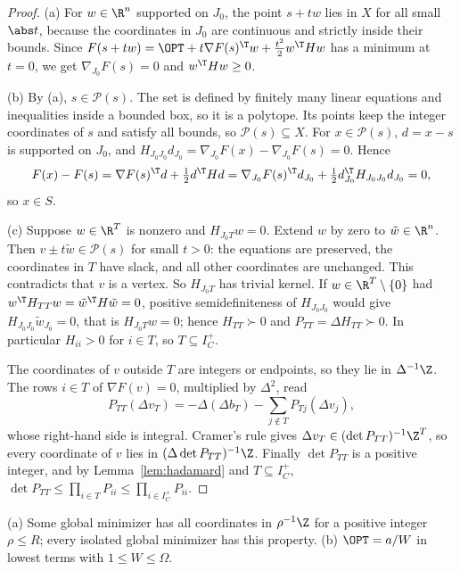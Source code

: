 \begin{proof}
(a) For $w\in\R^n$ supported on $J_0$, the point $s+tw$ lies in $X$ for all
small $\abs t$, because the coordinates in $J_0$ are continuous and strictly
inside their bounds. Since $F(s+tw)=\OPT+t\nabla F(s)^{\T}w+\frac{t^2}2w^{\T}Hw$
has a minimum at $t=0$, we get $\nabla_{J_0}F(s)=0$ and $w^{\T}Hw\ge0$.

(b) By (a), $s\in\mathcal P(s)$. The set is defined by finitely many linear
equations and inequalities inside a bounded box, so it is a polytope. Its
points keep the integer coordinates of $s$ and satisfy all bounds, so
$\mathcal P(s)\subseteq X$. For $x\in\mathcal P(s)$, $d=x-s$ is supported on
$J_0$, and $H_{J_0J_0}d_{J_0}=\nabla_{J_0}F(x)-\nabla_{J_0}F(s)=0$. Hence
\[
F(x)-F(s)=\nabla F(s)^{\T}d+\tfrac12d^{\T}Hd
=\nabla_{J_0}F(s)^{\T}d_{J_0}+\tfrac12d_{J_0}^{\T}H_{J_0J_0}d_{J_0}=0 ,
\]
so $x\in S$.

(c) Suppose $w\in\R^T$ is nonzero and $H_{J_0T}w=0$. Extend $w$ by zero to
$\tilde w\in\R^n$. Then $v\pm t\tilde w\in\mathcal P(s)$ for small $t>0$: the
equations are preserved, the coordinates in $T$ have slack, and all other
coordinates are unchanged. This contradicts that $v$ is a vertex. So
$H_{J_0T}$ has trivial kernel. If $w\in\R^T\setminus\{0\}$ had
$w^{\T}H_{TT}w=\tilde w^{\T}H\tilde w=0$, positive semidefiniteness of
$H_{J_0J_0}$ would give $H_{J_0J_0}\tilde w_{J_0}=0$, that is
$H_{J_0T}w=0$; hence $H_{TT}\succ0$ and $P_{TT}=\Delta H_{TT}\succ0$. In
particular $H_{ii}>0$ for $i\in T$, so $T\subseteq I_C^+$.

The coordinates of $v$ outside $T$ are integers or endpoints, so they lie in
$\Delta^{-1}\Z$. The rows $i\in T$ of $\nabla F(v)=0$, multiplied by $\Delta^2$, read
\[
P_{TT}(\Delta v_T)=-\Delta(\Delta b_T)-\sum_{j\notin T}P_{Tj}(\Delta v_j),
\]
whose right-hand side is integral. Cramer's rule gives
$\Delta v_T\in(\det P_{TT})^{-1}\Z^T$, so every coordinate of $v$ lies in
$(\Delta\det P_{TT})^{-1}\Z$. Finally $\det P_{TT}$ is a positive integer, and by
Lemma~\ref{lem:hadamard} and $T\subseteq I_C^+$,
$\det P_{TT}\le\prod_{i\in T}P_{ii}\le\prod_{i\in I_C^+}P_{ii}$.
\end{proof}

\begin{corollary}\label{cor:height}
(a) Some global minimizer has all coordinates in $\rho^{-1}\Z$ for a positive
integer $\rho\le R$; every isolated global minimizer has this property.
(b) $\OPT=a/W$ in lowest terms with $1\le W\le \Omega$.
\end{corollary}

